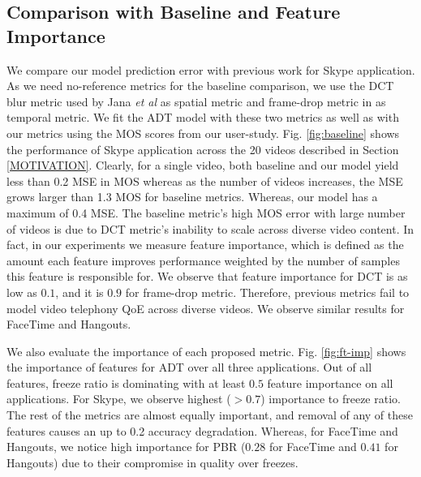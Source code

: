 \subsection{Comparison with Baseline and Feature Importance}
We compare our model prediction error with previous work for Skype application. As we need no-reference metrics for the baseline comparison, we use the DCT blur metric used by Jana {\em et al} as spatial metric and frame-drop metric in \cite{usman2017no} as temporal metric. We fit the ADT model with these two metrics as well as with our metrics using the MOS scores from our user-study. Fig. \ref{fig:baseline} shows the performance of Skype application across the 20 videos described in Section \ref{MOTIVATION}. Clearly, for a single video, both baseline and our model yield less than 0.2 MSE in MOS whereas as the number of videos increases, the MSE grows larger than 1.3 MOS for baseline metrics. Whereas, our model has a maximum of 0.4 MSE. The baseline metric's high MOS error with large number of videos is due to DCT metric's inability to scale across diverse video content. In fact, in our experiments we measure feature importance, which is defined as the amount each feature improves performance weighted by the number of samples this feature is responsible for. We observe that feature importance for DCT is as low as $0.1$, and it is $0.9$ for frame-drop metric. Therefore, previous metrics fail to model video telephony QoE across diverse videos. We observe similar results for FaceTime and Hangouts.

We also evaluate the importance of each proposed metric. Fig. \ref{fig:ft-imp} shows the importance of features for ADT over all three applications. Out of all features, freeze ratio is dominating with at least $0.5$ feature importance on all applications. For Skype, we observe highest ($>0.7$) importance to freeze ratio. The rest of the metrics are almost equally important, and removal of any of these features causes an up to 0.2 accuracy degradation. Whereas, for FaceTime and Hangouts, we notice high importance for PBR ($0.28$ for FaceTime and $0.41$ for Hangouts) due to their compromise in quality over freezes.

